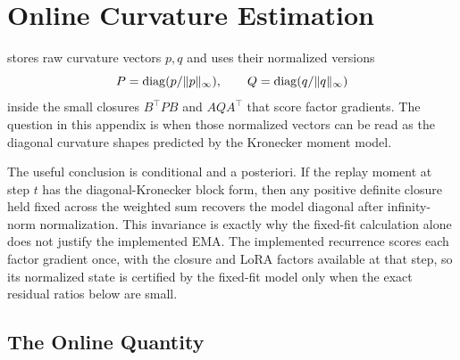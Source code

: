 \section{Online Curvature Estimation}
\label{app:matnormal-04}
 stores raw curvature vectors $p,q$ and uses their normalized
versions
\[
  P=\operatorname{diag}(p/\| p\|_\infty),
  \qquad
  Q=\operatorname{diag}(q/\| q\|_\infty)
\]
inside the small closures $B^\top P B$ and $AQA^\top$ that score factor
gradients. The question in this appendix is when those normalized vectors can be
read as the diagonal curvature shapes predicted by the Kronecker moment model.

The useful conclusion is conditional and a posteriori. If the replay moment at
step $t$ has the diagonal-Kronecker block form, then any positive definite
closure held fixed across the weighted sum recovers the model diagonal after
infinity-norm normalization. This invariance is exactly why the fixed-fit
calculation alone does not justify the implemented EMA. The implemented
recurrence scores each factor gradient once, with the closure and LoRA factors
available at that step, so its normalized state is certified by the fixed-fit
model only when the exact residual ratios below are small.

\subsection{The Online Quantity}
\label{sec:weighted-estimation-04}

